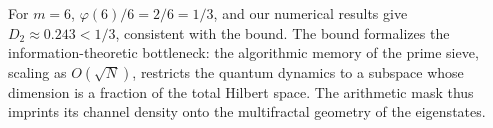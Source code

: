 \documentclass[11pt,a4paper]{article}
\begin{document}
For $m=6$, $\varphi(6)/6 = 2/6 = 1/3$, and our numerical results give $D_2 \approx 0.243 < 1/3$, consistent with the bound. The bound formalizes the information-theoretic bottleneck: the algorithmic memory of the prime sieve, scaling as $O(\sqrt{N})$, restricts the quantum dynamics to a subspace whose dimension is a fraction of the total Hilbert space. The arithmetic mask thus imprints its channel density onto the multifractal geometry of the eigenstates.



\end{document}
